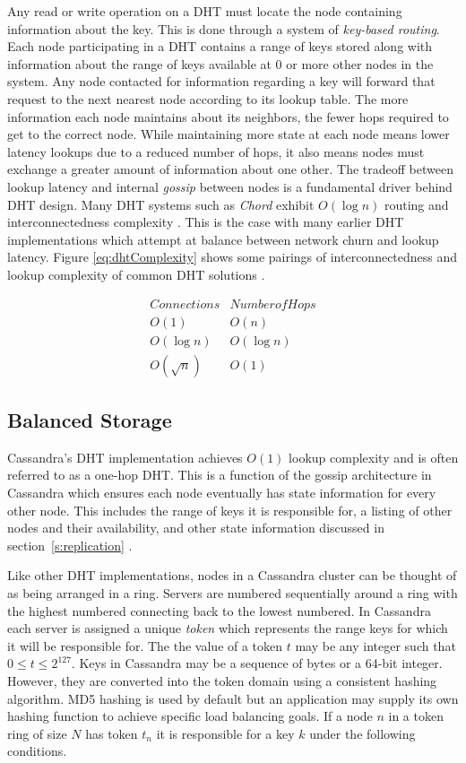 \documentclass[twocolumn]{article}
\begin{document}
Any read or write operation on a DHT must locate the node containing information about the key. This is done through a system of \emph{key-based routing}.  Each node participating in a DHT contains a range of keys stored along with information about the range of keys available at 0 or more other nodes in the system.  Any node contacted for information regarding a key will forward that request to the next nearest node according to its lookup table. The more information each node maintains about its neighbors, the fewer hops required to get to the correct node.  While maintaining more state at each node means lower latency lookups due to a reduced number of hops, it also means nodes must exchange a greater amount of information about one other.  The tradeoff between lookup latency and internal \emph{gossip} between nodes is a fundamental driver behind DHT design. Many DHT systems such as \emph{Chord} exhibit $O(\log n)$ routing and interconnectedness complexity \cite{ref:chord,ref:onehop}. This is the case with many earlier DHT implementations which attempt at balance between network churn and lookup latency. Figure \ref{eq:dhtComplexity} shows some pairings of interconnectedness and lookup complexity of common DHT solutions \cite{ref:dht}.

\[
\begin{array}{ll}\label{eq:dhtComplexity}
  Connections & Number of Hops \\
  O(1) & O(n) \\
  O(\log n) & O(\log n) \\
  O(\sqrt n) & O(1)
\end{array}
\]

\subsection{Balanced Storage}\label{s:storage}

Cassandra's DHT implementation achieves $O(1)$ lookup complexity and is often referred to as a one-hop DHT.  This is a function of the gossip architecture in Cassandra which ensures each node eventually has state information for every other node. This includes the range of keys it is responsible for, a listing of other nodes and their availability, and other state information discussed in section~\ref{s:replication} \cite{ref:cgossip}.

Like other DHT implementations, nodes in a Cassandra cluster can be thought of as being arranged in a ring.  Servers are numbered sequentially around a ring with the highest numbered connecting back to the lowest numbered.  In Cassandra each server is assigned a unique \emph{token} which represents the range keys for which it will be responsible for. The the value of a token $t$ may be any integer such that $0 \le t \le 2^{127}$.  Keys in Cassandra may be a sequence of bytes or a 64-bit integer.  However, they are converted into the token domain using a consistent hashing algorithm.  MD5 hashing is used by default but an application may supply its own hashing function to achieve specific load balancing goals.  If a node $n$ in a token ring of size $N$ has token $t_n$ it is responsible for a key $k$ under the following conditions.
\end{document}

